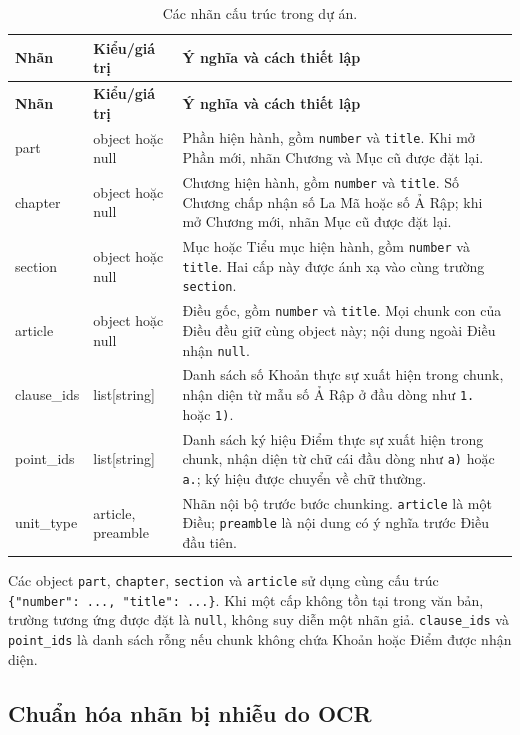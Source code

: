 \documentclass[12pt,a4paper]{article}
\newcommand{\code}[1]{\texttt{#1}}
\newcommand{\nullvalue}{\texttt{null}}
\begin{document}
\begin{longtable}{>{\ttfamily}p{2.8cm}p{3.0cm}p{8.0cm}}
\caption{Các nhãn cấu trúc trong dự án.}\label{tab:structure-labels}\\
\toprule
\normalfont\textbf{Nhãn} & \textbf{Kiểu/giá trị} & \textbf{Ý nghĩa và cách thiết lập} \\
\midrule
\endfirsthead
\toprule
\normalfont\textbf{Nhãn} & \textbf{Kiểu/giá trị} & \textbf{Ý nghĩa và cách thiết lập} \\
\midrule
\endhead
part & object hoặc null & Phần hiện hành, gồm \code{number} và \code{title}. Khi mở Phần mới, nhãn Chương và Mục cũ được đặt lại. \\
chapter & object hoặc null & Chương hiện hành, gồm \code{number} và \code{title}. Số Chương chấp nhận số La Mã hoặc số Ả Rập; khi mở Chương mới, nhãn Mục cũ được đặt lại. \\
section & object hoặc null & Mục hoặc Tiểu mục hiện hành, gồm \code{number} và \code{title}. Hai cấp này được ánh xạ vào cùng trường \code{section}. \\
article & object hoặc null & Điều gốc, gồm \code{number} và \code{title}. Mọi chunk con của Điều đều giữ cùng object này; nội dung ngoài Điều nhận \nullvalue{}. \\
clause\_ids & list[string] & Danh sách số Khoản thực sự xuất hiện trong chunk, nhận diện từ mẫu số Ả Rập ở đầu dòng như \code{1.} hoặc \code{1)}. \\
point\_ids & list[string] & Danh sách ký hiệu Điểm thực sự xuất hiện trong chunk, nhận diện từ chữ cái đầu dòng như \code{a)} hoặc \code{a.}; ký hiệu được chuyển về chữ thường. \\
unit\_type & article, preamble & Nhãn nội bộ trước bước chunking. \code{article} là một Điều; \code{preamble} là nội dung có ý nghĩa trước Điều đầu tiên. \\
\bottomrule
\end{longtable}

Các object \code{part}, \code{chapter}, \code{section} và \code{article} sử dụng
cùng cấu trúc \code{\{"number": ..., "title": ...\}}. Khi một cấp không tồn
tại trong văn bản, trường tương ứng được đặt là \nullvalue{}, không suy diễn một
nhãn giả. \code{clause\_ids} và \code{point\_ids} là danh sách rỗng nếu chunk
không chứa Khoản hoặc Điểm được nhận diện.

\subsection{Chuẩn hóa nhãn bị nhiễu do OCR}
\end{document}

